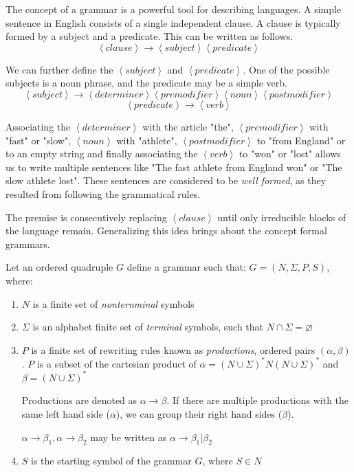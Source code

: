 The concept of a grammar is a powerful tool for describing languages\cite[p. 52]{Linz2016Introduction}. A simple sentence in English consists of a single independent clause. A clause is typically formed by a subject and a predicate. This can be written as follows.
$$ \left< clause \right> \rightarrow \left< subject \right> \left< predicate \right> $$

We can further define the $\left< subject \right>$ and $\left< predicate \right>$. One of the possible subjects is a noun phrase, and the predicate may be a simple verb.
$$\left< subject \right>   \rightarrow   \left< determiner \right>   \left< premodifier \right>    \left< noun \right>    \left< postmodifier \right>$$
$$\left< predicate \right> \rightarrow \left< verb \right>$$

Associating the $\left< determiner \right>$ with the article "the", $\left< premodifier \right>$ with "fast" or "slow", $\left< noun \right>$ with "athlete", $\left< postmodifier \right>$ to "from England" or to an empty string and finally associating the $\left< verb \right>$ to "won" or "lost" allows us to write multiple sentences like "The fast athlete from England won" or "The slow athlete lost". These sentences are considered to be \emph{well formed}, as they resulted from following the grammatical rules.

The premise is consecutively replacing $\left< clause \right>$ until only irreducible blocks of the language remain. Generalizing this idea brings about the concept formal grammars.

\begin{definition}[Grammar]
\label{def:grammar}
\cite{Salomaa1987Formal}
Let an ordered quadruple $G$ define a grammar such that: $G=\left(N, \Sigma, P, S \right)$, where:
\begin{enumerate}
\item $N$ is a finite set of \emph{nonternminal} symbols
\item $\Sigma$ is an alphabet finite set of \emph{terminal} symbols, such that $N \cap \Sigma = \varnothing$
\item $P$ is a finite set of rewriting rules known as \emph{productions}, ordered pairs $\left( \alpha, \beta \right)$.
$P$ is a subset of the cartesian product of $\alpha = \left(N \cup \Sigma\right)^* N \left(N \cup \Sigma\right)^*$ and $\beta = \left(N \cup \Sigma\right)^*$


Productions are denoted as $\alpha \rightarrow \beta$.
If there are multiple productions with the same left hand side ($\alpha$), we can group their right hand sides ($\beta$).


$\alpha \rightarrow \beta_1, \alpha \rightarrow \beta_2$ may be written as $\alpha \rightarrow \beta_1 | \beta_2$

\item $S$ is the starting symbol of the grammar $G$, where $S \in N$
\end{enumerate}
\end{definition}

